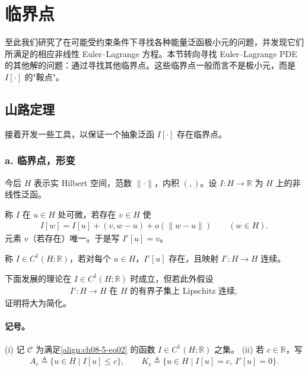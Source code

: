 \documentclass[../../main.tex]{subfiles}
\begin{document}
\section{临界点}\label{section:ch08-5-临界点}

至此我们研究了在可能受约束条件下寻找各种能量泛函极小元的问题，并发现它们所满足的相应非线性 Euler--Lagrange 方程。本节转向寻找 Euler--Lagrange PDE 的其他解的问题：通过寻找其他临界点。这些临界点一般而言不是极小元，而是 $I[\cdot]$ 的"鞍点"。

\subsection{山路定理}\label{subsection:ch08-5-1-山路定理}

接着开发一些工具，以保证一个抽象泛函 $I[\cdot]$ 存在临界点。

\subsubsection*{a. 临界点，形变}

今后 $H$ 表示实 Hilbert 空间，范数 $\|\cdot\|$，内积 $(,)$。设 $I:H\to\mathbb{R}$ 为 $H$ 上的非线性泛函。

\begin{definition}\label{definition:ch08-5-可微}
称 $I$ 在 $u\in H$ 处可微，若存在 $v\in H$ 使
\begin{align}
I[w]=I[u]+(v,w-u)+o(\|w-u\|)\qquad (w\in H).\label{align:ch08-5-eq01}
\end{align}
元素 $v$（若存在）唯一。于是写 $I'[u]=v$。
\end{definition}

\begin{definition}\label{definition:ch08-5-C1}
称 $I\in C^1(H;\mathbb{R})$，若对每个 $u\in H$，$I'[u]$ 存在，且映射 $I':H\to H$ 连续。
\end{definition}

下面发展的理论在 $I\in C^1(H;\mathbb{R})$ 时成立，但若此外假设
\begin{align}
I':H\to H\text{ 在 }H\text{ 的有界子集上 Lipschitz 连续},\label{align:ch08-5-eq02}
\end{align}
证明将大为简化。

\paragraph{记号。}
(i) 记 $\mathcal{C}$ 为满足\eqref{align:ch08-5-eq02} 的函数 $I\in C^1(H;\mathbb{R})$ 之集。
(ii) 若 $c\in\mathbb{R}$，写
\begin{align*}
A_c\triangleq\{u\in H\mid I[u]\leqslant c\},\qquad K_c\triangleq\{u\in H\mid I[u]=c,\ I'[u]=0\}.
\end{align*}
\end{document}
